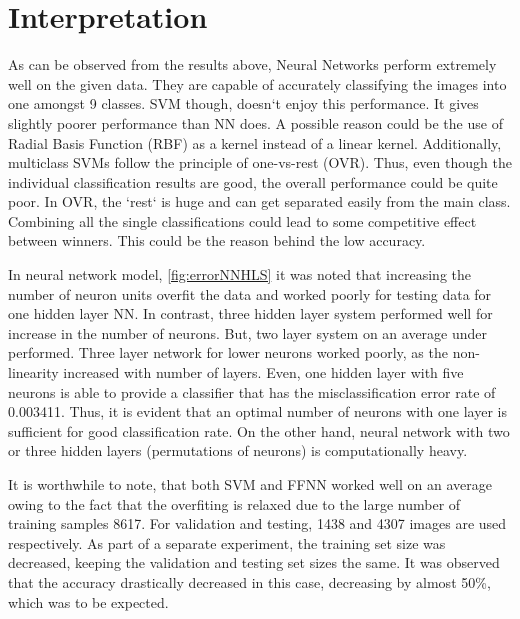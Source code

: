 \documentclass[letterpaper,12pt, onecolumn]{article}%
\begin{document}
\section{Interpretation} \label{sec:interp} %
\noindent
As can be observed from the results above, Neural Networks perform extremely well on the given data. They are capable of accurately classifying the images into one amongst 9 classes. SVM though, doesn`t enjoy this performance. It gives slightly poorer performance than NN does. A possible reason could be the use of Radial Basis Function (RBF) as a kernel instead of a linear kernel. Additionally, multiclass SVMs follow the principle of one-vs-rest (OVR). Thus, even though the individual classification results are good, the overall performance could be quite poor. In OVR, the `rest` is huge and can get separated easily from the main class. Combining all the single classifications could lead to some competitive effect between winners. This could be the reason behind the low accuracy.

In neural network model, \cref{fig:errorNNHLS} it was noted that increasing the number of neuron units overfit the data and worked poorly for testing data for one hidden layer NN. In contrast, three hidden layer system performed well for increase in the number of neurons. But, two layer system on an average under performed. Three layer network for lower neurons worked poorly, as the non-linearity increased with number of layers. Even, one hidden layer with five neurons is able to provide a classifier that has the misclassification error rate of 0.003411. Thus, it is evident that an optimal number of neurons with one layer is sufficient for good classification rate. On the other hand, neural network with two or three hidden layers (permutations of neurons) is computationally heavy.

It is worthwhile to note, that both SVM and FFNN worked well on an average owing to the fact that the overfiting is relaxed due to the large number of training samples 8617. For validation and testing, 1438 and 4307 images are used respectively. As part of a separate experiment, the training set size was decreased, keeping the validation and testing set sizes the same. It was observed that the accuracy drastically decreased in this case, decreasing by almost 50\%, which was to be expected.


\end{document}
